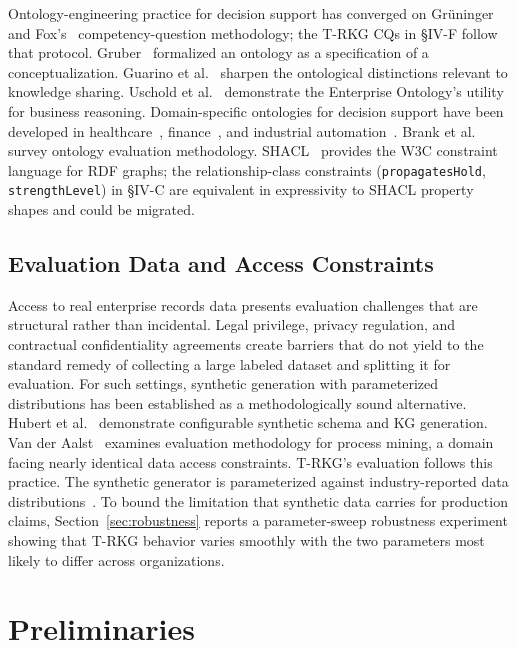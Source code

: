 \documentclass{ieeeaccess}
\begin{document}
Ontology-engineering practice for decision support has converged on Gr\"{u}ninger and Fox's~\cite{gruninger1995} competency-question methodology; the T-RKG CQs in §IV-F follow that protocol. Gruber~\cite{gruber1995} formalized an ontology as a specification of a conceptualization. Guarino et al.~\cite{guarino2009} sharpen the ontological distinctions relevant to knowledge sharing. Uschold et al.~\cite{uschold1998} demonstrate the Enterprise Ontology's utility for business reasoning. Domain-specific ontologies for decision support have been developed in healthcare~\cite{schriml2019}, finance~\cite{fibo}, and industrial automation~\cite{ringsquandl2015}. Brank et al.~\cite{brank2005} survey ontology evaluation methodology. SHACL~\cite{shacl} provides the W3C constraint language for RDF graphs; the relationship-class constraints (\texttt{propagatesHold}, \texttt{strengthLevel}) in §IV-C are equivalent in expressivity to SHACL property shapes and could be migrated.

\subsection{Evaluation Data and Access Constraints}

Access to real enterprise records data presents evaluation challenges that are structural rather than incidental. Legal privilege, privacy regulation, and contractual confidentiality agreements create barriers that do not yield to the standard remedy of collecting a large labeled dataset and splitting it for evaluation. For such settings, synthetic generation with parameterized distributions has been established as a methodologically sound alternative. Hubert et al.~\cite{pygraft} demonstrate configurable synthetic schema and KG generation. Van der Aalst~\cite{vanderaalst2016} examines evaluation methodology for process mining, a domain facing nearly identical data access constraints. T-RKG's evaluation follows this practice. The synthetic generator is parameterized against industry-reported data distributions~\cite{databerg,igrm}. To bound the limitation that synthetic data carries for production claims, Section~\ref{sec:robustness} reports a parameter-sweep robustness experiment showing that T-RKG behavior varies smoothly with the two parameters most likely to differ across organizations.

\section{Preliminaries}
\end{document}
